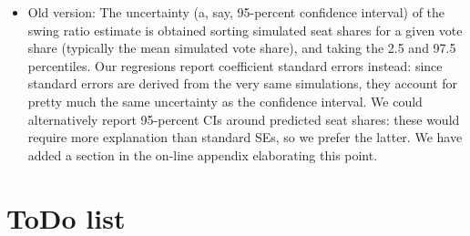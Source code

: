 \documentclass{article}
\begin{document}
\begin{enumerate}
\begin{itemize}
\item Old version: The uncertainty (a, say, 95-percent confidence interval) of the swing ratio estimate is obtained sorting simulated seat shares for a given vote share (typically the mean simulated vote share), and taking the 2.5 and 97.5 percentiles. Our regresions report coefficient standard errors instead: since standard errors are derived from the very same simulations, they account for pretty much the same uncertainty as the confidence interval. We could alternatively report 95-percent CIs around predicted seat shares: these would require more explanation than standard SEs, so we prefer the latter. We have added a section in the on-line appendix elaborating this point.
\end{itemize}
\end{enumerate}
\section{ToDo list}
\label{sec:orgheadline41}
\end{document}
